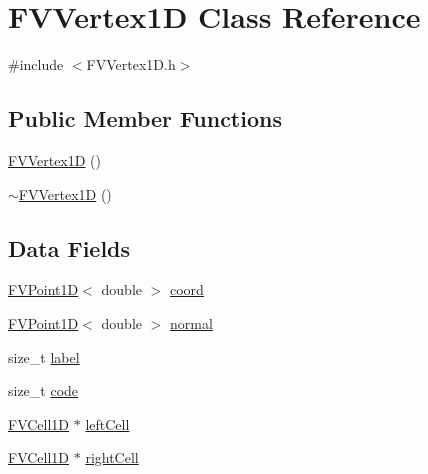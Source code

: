 \hypertarget{classFVVertex1D}{
\section{FVVertex1D Class Reference}
\label{d6/d5d/classFVVertex1D}
}


{\ttfamily \#include $<$FVVertex1D.h$>$}

\subsection*{Public Member Functions}
\begin{DoxyCompactItemize}
\item 
\hyperlink{classFVVertex1D_a1f0315834c5791626f1af40d50530806}{FVVertex1D} ()
\item 
\hyperlink{classFVVertex1D_a23214cc0ef7014cf0ef45d793570ab9b}{$\sim$FVVertex1D} ()
\end{DoxyCompactItemize}
\subsection*{Data Fields}
\begin{DoxyCompactItemize}
\item 
\hyperlink{classFVPoint1D}{FVPoint1D}$<$ double $>$ \hyperlink{classFVVertex1D_a24bb228b08fcf85e9bf69e16c270fe11}{coord}
\item 
\hyperlink{classFVPoint1D}{FVPoint1D}$<$ double $>$ \hyperlink{classFVVertex1D_ad6cbf5e80f090335e6723db414b554c0}{normal}
\item 
size\_\-t \hyperlink{classFVVertex1D_a1ec973463c76e6d9e91160720959ad68}{label}
\item 
size\_\-t \hyperlink{classFVVertex1D_acf258c3b3328a96e3ee1e3b875b7874f}{code}
\item 
\hyperlink{classFVCell1D}{FVCell1D} $\ast$ \hyperlink{classFVVertex1D_ae3725a6730dd0c3f3eedb3d13737820a}{leftCell}
\item 
\hyperlink{classFVCell1D}{FVCell1D} $\ast$ \hyperlink{classFVVertex1D_a5dac984cc6f3bc794792833147efc3b8}{rightCell}
\end{DoxyCompactItemize}


